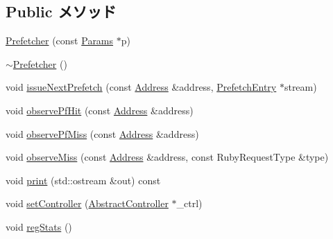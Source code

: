 \subsection*{Public メソッド}
\begin{DoxyCompactItemize}
\item 
\hyperlink{classPrefetcher_a103945d22642f41049b79540b7b03773}{Prefetcher} (const \hyperlink{classPrefetcher_aa178e3582d29b08c028c11634875499c}{Params} $\ast$p)
\item 
\hyperlink{classPrefetcher_a7b071405fe38f9da007866b7510e773c}{$\sim$Prefetcher} ()
\item 
void \hyperlink{classPrefetcher_a837cf1d68756e156957f5d7c36d5da7e}{issueNextPrefetch} (const \hyperlink{classAddress}{Address} \&address, \hyperlink{classPrefetchEntry}{PrefetchEntry} $\ast$stream)
\item 
void \hyperlink{classPrefetcher_ad42b59b907f12b2820fda827538f272f}{observePfHit} (const \hyperlink{classAddress}{Address} \&address)
\item 
void \hyperlink{classPrefetcher_a54bad4fe990aa1c8c9e3910c7c972089}{observePfMiss} (const \hyperlink{classAddress}{Address} \&address)
\item 
void \hyperlink{classPrefetcher_a0aeb99b55e0ebe2fe1ebc894a1f08ebc}{observeMiss} (const \hyperlink{classAddress}{Address} \&address, const RubyRequestType \&type)
\item 
void \hyperlink{classPrefetcher_ac55fe386a101fbae38c716067c9966a0}{print} (std::ostream \&out) const 
\item 
void \hyperlink{classPrefetcher_ad1772ea493bb64a517a46484972c9efc}{setController} (\hyperlink{classAbstractController}{AbstractController} $\ast$\_\-ctrl)
\item 
void \hyperlink{classPrefetcher_a4dc637449366fcdfc4e764cdf12d9b11}{regStats} ()
\end{DoxyCompactItemize}
